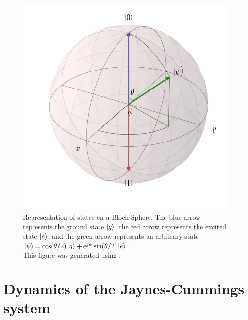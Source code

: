 \begin{figure}
\centering
\includegraphics[width=\linewidth]{Figures/bloch_rep.png}
\decoRule
\caption[Bloch Sphere Representation]{Representation of states on a Bloch Sphere. The blue arrow represents the ground state $\ket{g}$, the red arrow represents the excited state $\ket{e}$, and the green arrow represents an arbitrary state $\ket{\psi} = \cos(\theta/2)\ket{g}+e^{j\phi}\sin(\theta/2)\ket{e}$.\\This figure was generated using \cite{Johansson2012}.}
\label{fig:bloch rep}
\end{figure}

\section{Dynamics of the Jaynes-Cummings system}

